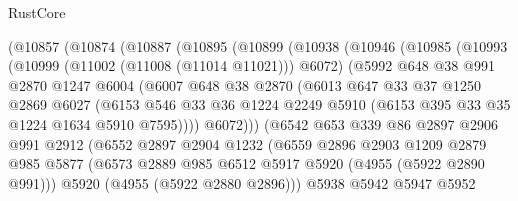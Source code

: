 \begin{lexlean}{RustCore}
\begin{coremodule}
              (@10857
                (@10874
                  (@10887
                    (@10895
                      (@10899
                        (@10938
                          (@10946
                            (@10985
                              (@10993
                                (@10999 (@11002 (@11008 (@11014 @11021))) @6072)
                                (@5992
                                  @648
                                  @38
                                  @991
                                  @2870
                                  @1247
                                  @6004
                                  (@6007
                                    @648
                                    @38
                                    @2870
                                    (@6013
                                      @647
                                      @33
                                      @37
                                      @1250
                                      @2869
                                      @6027
                                      (@6153
                                        @546
                                        @33
                                        @36
                                        @1224
                                        @2249
                                        @5910
                                        (@6153 @395 @33 @35 @1224 @1634 @5910 @7595))))
                                  @6072)))
                            (@6542
                              @653
                              @339
                              @86
                              @2897
                              @2906
                              @991
                              @2912
                              (@6552
                                @2897
                                @2904
                                @1232
                                (@6559
                                  @2896
                                  @2903
                                  @1209
                                  @2879
                                  @985
                                  @5877
                                  (@6573 @2889 @985 @6512 @5917 @5920 (@4955 (@5922 @2890 @991)))
                                  @5920
                                  (@4955 (@5922 @2880 @2896)))
                                @5938
                                @5942
                                @5947
                                @5952

\end{coremodule}
\end{lexlean}
